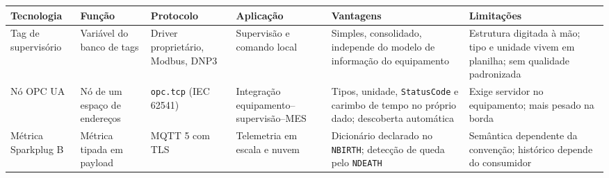 \begin{longtable}[]{@{}
  >{\raggedright\arraybackslash}p{}
  >{\raggedright\arraybackslash}p{}
  >{\raggedright\arraybackslash}p{}
  >{\raggedright\arraybackslash}p{}
  >{\raggedright\arraybackslash}p{}
  >{\raggedright\arraybackslash}p{}@{}}
\toprule\noalign{}
\begin{minipage}[b]{\linewidth}\raggedright
Tecnologia
\end{minipage} & \begin{minipage}[b]{\linewidth}\raggedright
Função
\end{minipage} & \begin{minipage}[b]{\linewidth}\raggedright
Protocolo
\end{minipage} & \begin{minipage}[b]{\linewidth}\raggedright
Aplicação
\end{minipage} & \begin{minipage}[b]{\linewidth}\raggedright
Vantagens
\end{minipage} & \begin{minipage}[b]{\linewidth}\raggedright
Limitações
\end{minipage} \\
\midrule\noalign{}
\endhead
\bottomrule\noalign{}
\endlastfoot
Tag de supervisório & Variável do banco de tags & Driver proprietário, Modbus, DNP3 & Supervisão e comando local & Simples, consolidado, independe do modelo de informação do equipamento & Estrutura digitada à mão; tipo e unidade vivem em planilha; sem qualidade padronizada \\
Nó OPC UA & Nó de um espaço de endereços & \passthrough{\lstinline!opc.tcp!} (IEC 62541) & Integração equipamento--supervisão--MES & Tipos, unidade, \passthrough{\lstinline!StatusCode!} e carimbo de tempo no próprio dado; descoberta automática & Exige servidor no equipamento; mais pesado na borda \\
Métrica Sparkplug B & Métrica tipada em payload & MQTT 5 com TLS & Telemetria em escala e nuvem & Dicionário declarado no \passthrough{\lstinline!NBIRTH!}; detecção de queda pelo \passthrough{\lstinline!NDEATH!} & Semântica dependente da convenção; histórico depende do consumidor \\
\end{longtable}

